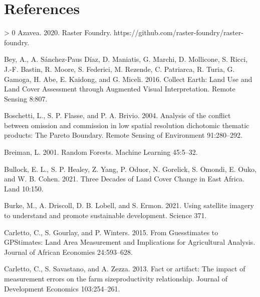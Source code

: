 \documentclass[11pt,a4paper]{article}
\newlength{\cslhangindent}
\newenvironment{CSLReferences}[3] %
 {%
  \setlength{\parindent}{0pt}
  \ifodd #1 \everypar{\setlength{\hangindent}{\cslhangindent}}\ignorespaces\fi
  \ifnum #2 > 0
  \setlength{\parskip}{#2\baselineskip}
  \fi
 }%
 {}
\begin{document}
\hypertarget{references}{%
\section{References}\label{references}}

\singlespace

\hypertarget{refs}{}
\begin{CSLReferences}{1}{0}
\leavevmode\hypertarget{ref-azaveaRasterFoundry2020}{}%
Azavea. 2020. Raster {Foundry}.
https://github.com/raster-foundry/raster-foundry.

\leavevmode\hypertarget{ref-BeyCollectEarthLand2016}{}%
Bey, A., A. Sánchez-Paus Díaz, D. Maniatis, G. Marchi, D. Mollicone, S.
Ricci, J.-F. Bastin, R. Moore, S. Federici, M. Rezende, C. Patriarca, R.
Turia, G. Gamoga, H. Abe, E. Kaidong, and G. Miceli. 2016. Collect
{Earth}: Land {Use} and {Land Cover Assessment} through {Augmented
Visual Interpretation}. Remote Sensing 8:807.

\leavevmode\hypertarget{ref-boschettiAnalysisConflictOmission2004}{}%
Boschetti, L., S. P. Flasse, and P. A. Brivio. 2004. Analysis of the
conflict between omission and commission in low spatial resolution
dichotomic thematic products: The {Pareto Boundary}. Remote Sensing of
Environment 91:280--292.

\leavevmode\hypertarget{ref-BreimanRandomForests2001}{}%
Breiman, L. 2001. Random {Forests}. Machine Learning 45:5--32.

\leavevmode\hypertarget{ref-bullockThreeDecadesLand2021}{}%
Bullock, E. L., S. P. Healey, Z. Yang, P. Oduor, N. Gorelick, S. Omondi,
E. Ouko, and W. B. Cohen. 2021. Three {Decades} of {Land Cover Change}
in {East Africa}. Land 10:150.

\leavevmode\hypertarget{ref-burkeUsingSatelliteImagery2021}{}%
Burke, M., A. Driscoll, D. B. Lobell, and S. Ermon. 2021. Using
satellite imagery to understand and promote sustainable development.
Science 371.

\leavevmode\hypertarget{ref-CarlettoGuesstimatesGPStimatesLand2015}{}%
Carletto, C., S. Gourlay, and P. Winters. 2015. From {Guesstimates} to
{GPStimates}: Land {Area Measurement} and {Implications} for
{Agricultural Analysis}. Journal of African Economies 24:593--628.

\leavevmode\hypertarget{ref-CarlettoFactartifactimpact2013}{}%
Carletto, C., S. Savastano, and A. Zezza. 2013. Fact or artifact: The
impact of measurement errors on the farm size{}productivity
relationship. Journal of Development Economics 103:254--261.


\end{CSLReferences}
\end{document}
